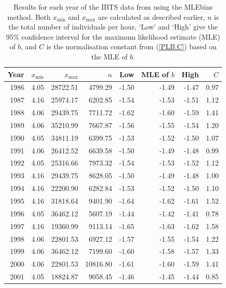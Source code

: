 \documentclass[12pt, letter]{article}
\newcommand{\xmin}{x_{\mathrm{min}}}
\newcommand{\xmax}{x_{\mathrm{max}}}
\begin{document}
\begin{table}[ht]
\centering
\caption{Results for each year of the IBTS data from using the MLEbins method.
Both $\xmin$ and $\xmax$ are calculated as described earlier,
$n$ is the total number of individuals per hour,
`Low' and `High' give the 95\% confidence interval for the maximum likelihood
estimate (MLE) of $b$,
and $C$ is the normalisation constant from (\ref{PLB.C}) based on the MLE of $b$. }
\begin{tabular}{rrrrrrrr}
  \hline
Year & $\xmin$ & $\xmax$ & $n$ & Low & MLE of $b$ & High & $C$\\
  \hline
1986 & 4.05 & 28722.51 & 4799.29 & -1.50 & -1.49 & -1.47 & 0.97 \\
  1987 & 4.16 & 25974.17 & 6202.85 & -1.54 & -1.53 & -1.51 & 1.12 \\
  1988 & 4.06 & 29439.75 & 7711.72 & -1.62 & -1.60 & -1.59 & 1.41 \\
  1989 & 4.06 & 35210.99 & 7667.87 & -1.56 & -1.55 & -1.54 & 1.20 \\
  1990 & 4.05 & 34811.19 & 6399.75 & -1.53 & -1.52 & -1.50 & 1.07 \\
  1991 & 4.06 & 26412.52 & 6639.58 & -1.50 & -1.49 & -1.48 & 0.99 \\
  1992 & 4.05 & 25316.66 & 7973.32 & -1.54 & -1.53 & -1.52 & 1.12 \\
  1993 & 4.16 & 29439.75 & 8628.05 & -1.50 & -1.49 & -1.48 & 1.00 \\
  1994 & 4.16 & 22200.90 & 6282.84 & -1.53 & -1.52 & -1.50 & 1.10 \\
  1995 & 4.16 & 31818.64 & 9401.90 & -1.64 & -1.62 & -1.61 & 1.52 \\
  1996 & 4.05 & 36462.12 & 5607.19 & -1.44 & -1.42 & -1.41 & 0.78 \\
  1997 & 4.16 & 19360.99 & 9113.14 & -1.65 & -1.63 & -1.62 & 1.58 \\
  1998 & 4.06 & 22801.53 & 6927.12 & -1.57 & -1.55 & -1.54 & 1.22 \\
  1999 & 4.06 & 36462.12 & 7199.60 & -1.60 & -1.58 & -1.57 & 1.33 \\
  2000 & 4.06 & 22801.53 & 10816.80 & -1.61 & -1.60 & -1.59 & 1.41 \\
  2001 & 4.05 & 18824.87 & 9058.45 & -1.46 & -1.45 & -1.44 & 0.85 \\

\end{tabular}
\end{table}
\end{document}
